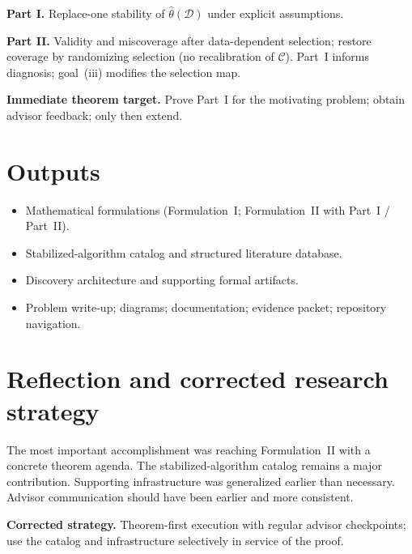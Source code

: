 \documentclass[11pt]{article}
\begin{document}
\vspace{3pt}
\textbf{Part I.} Replace-one stability of $\hat\theta(\mathcal{D})$ under explicit assumptions.

\textbf{Part II.} Validity and miscoverage after data-dependent selection; restore coverage by
randomizing selection (no recalibration of $\mathcal{C}$). Part~I informs diagnosis;
goal~(iii) modifies the selection map.

\textbf{Immediate theorem target.} Prove Part~I for the motivating problem; obtain advisor
feedback; only then extend.

\section{Outputs}

\begin{itemize}
  \item Mathematical formulations (Formulation~I; Formulation~II with Part~I / Part~II).
  \item Stabilized-algorithm catalog and structured literature database.
  \item Discovery architecture and supporting formal artifacts.
  \item Problem write-up; diagrams; documentation; evidence packet; repository navigation.
\end{itemize}

\section{Reflection and corrected research strategy}

The most important accomplishment was reaching Formulation~II with a concrete theorem agenda.
The stabilized-algorithm catalog remains a major contribution. Supporting infrastructure was
generalized earlier than necessary. Advisor communication should have been earlier and more
consistent.

\textbf{Corrected strategy.} Theorem-first execution with regular advisor checkpoints; use
the catalog and infrastructure selectively in service of the proof.

\end{document}
